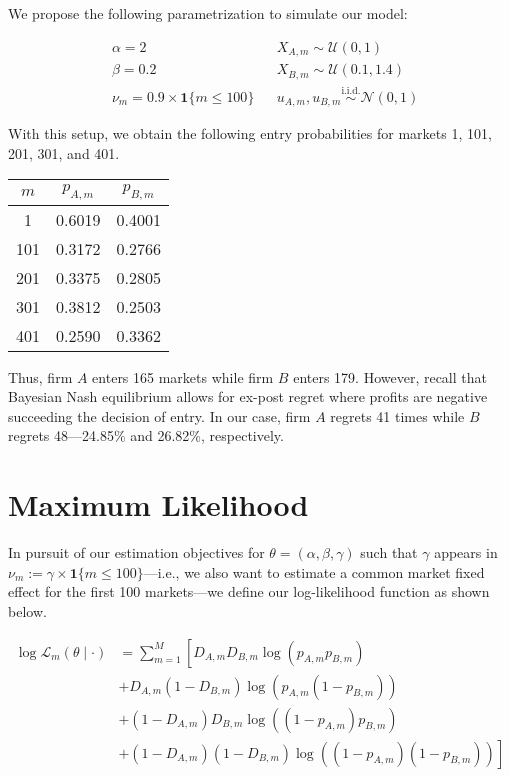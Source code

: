 \documentclass[cm,linguex]{glossa}
\newcommand{\iid}{\text{i.i.d.}}
\newcommand{\dnorm}{\mathcal{N}}
\newcommand{\dunif}{\mathcal{U}}
\begin{document}
We propose the following parametrization to simulate our model:

\begin{align*}
&\alpha =  2 && X_{A,m} \sim \dunif(0, 1) \\
&\beta = 0.2 && X_{B, m} \sim \dunif(0.1, 1.4) \\
&\nu_m = 0.9 \times \mathbf{1} \{ m \leq 100 \} && u_{A, m}, u_{B, m} \overset{\iid}{\sim} \dnorm(0, 1)
\end{align*}

With this setup, we obtain the following entry probabilities for markets
1, 101, 201, 301, and 401.

\begin{longtable}[]{@{}ccc@{}}
\toprule()
\(m\) & \(p_{A, m}\) & \(p_{B, m}\) \\
\midrule()
\endhead
1 & 0.6019 & 0.4001 \\
101 & 0.3172 & 0.2766 \\
201 & 0.3375 & 0.2805 \\
301 & 0.3812 & 0.2503 \\
401 & 0.2590 & 0.3362 \\
\bottomrule()
\end{longtable}

Thus, firm \(A\) enters 165 markets while firm \(B\) enters 179.
However, recall that Bayesian Nash equilibrium allows for ex-post regret
where profits are negative succeeding the decision of entry. In our
case, firm \(A\) regrets 41 times while \(B\) regrets 48---24.85\% and
26.82\%, respectively.

\hypertarget{maximum-likelihood}{%
\section{Maximum Likelihood}\label{maximum-likelihood}}

In pursuit of our estimation objectives for
\(\theta = (\alpha, \beta, \gamma)\) such that \(\gamma\) appears in
\(\nu_m := \gamma \times \mathbf{1} \{ m \leq 100 \}\)---i.e., we also
want to estimate a common market fixed effect for the first 100
markets---we define our log-likelihood function as shown below.

\begin{align*}
\log\mathcal{L}_{m} (\theta \mid \cdot) &= \sum_{m = 1}^{M} \left[ D_{A, m} D_{B, m} \log(p_{A, m} p_{B, m}) \right. \\
&+ D_{A, m} (1 - D_{B, m}) \log(p_{A, m} (1 - p_{B, m})) \\
&+ (1 - D_{A, m}) D_{B, m} \log((1 - p_{A, m}) p_{B, m}) \\
&+ \left. (1 - D_{A, m}) (1 - D_{B, m}) \log((1 - p_{A, m}) (1 - p_{B, m})) \right]
\end{align*}
\end{document}
